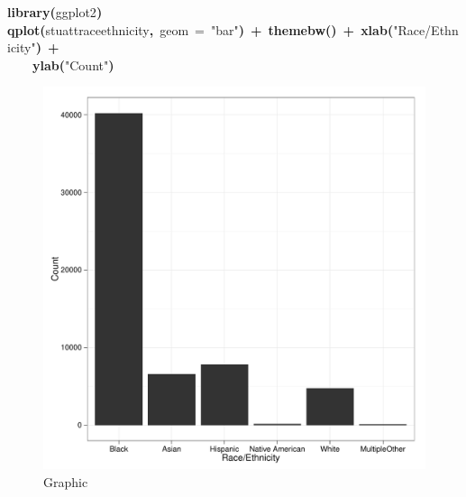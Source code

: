 \documentclass[12pt]{article}
\makeatletter
\newcommand{\hlfunctioncall}[1]{\textcolor[rgb]{0.501960784313725,0,0.329411764705882}{\textbf{#1}}}%
\newcommand{\hlstring}[1]{\textcolor[rgb]{0.6,0.6,1}{#1}}%
\newcommand{\hlkeyword}[1]{\textcolor[rgb]{0,0,0}{\textbf{#1}}}%
\newcommand{\hlargument}[1]{\textcolor[rgb]{0.690196078431373,0.250980392156863,0.0196078431372549}{#1}}%
\newcommand{\hlsymbol}[1]{\textcolor[rgb]{0,0,0}{#1}}%
\newcommand{\hlstd}[1]{\textcolor[rgb]{0,0,0}{#1}}%
\newenvironment{kframe}{%
 \def\FrameCommand##1{\hskip\@totalleftmargin \hskip-\fboxsep
 \colorbox{shadecolor}{##1}\hskip-\fboxsep
     \hskip-\linewidth \hskip-\@totalleftmargin \hskip\columnwidth}%
 \MakeFramed {\advance\hsize-\width
   \@totalleftmargin\z@ \linewidth\hsize
   \@setminipage}}%
 {\par\unskip\endMakeFramed}
\newenvironment{knitrout}{}{} %
\makeatother
\begin{document}
\begin{knitrout}
\color{fgcolor}\begin{kframe}
\begin{flushleft}
\ttfamily\noindent
\hlfunctioncall{library}\hlkeyword{(}\hlsymbol{ggplot2}\hlkeyword{)}\hspace*{\fill}\\
\hlstd{}\hlfunctioncall{qplot}\hlkeyword{(}\hlsymbol{stuatt}\hlkeyword{\usebox{\hlnormalsizeboxdollar}}\hlsymbol{race\usebox{\hlnormalsizeboxunderscore}ethnicity}\hlkeyword{,}{\ }\hlargument{geom}{\ }\hlargument{=}{\ }\hlstring{"{}bar"{}}\hlkeyword{)}{\ }\hlkeyword{+}{\ }\hlfunctioncall{theme\usebox{\hlnormalsizeboxunderscore}bw}\hlkeyword{(}\hlkeyword{)}{\ }\hlkeyword{+}{\ }\hlfunctioncall{xlab}\hlkeyword{(}\hlstring{"{}Race/Ethnicity"{}}\hlkeyword{)}{\ }\hlkeyword{+}\hspace*{\fill}\\
\hlstd{}{\ }{\ }{\ }{\ }\hlfunctioncall{ylab}\hlkeyword{(}\hlstring{"{}Count"{}}\hlkeyword{)}\mbox{}
\normalfont
\end{flushleft}
\end{kframe}\begin{figure}[]


\includegraphics[width=.75\textwidth,height=.35\paperheight]{figure/unnamed-chunk-9} \hfill{}

\caption[Graphic]{Graphic\label{fig:unnamed-chunk-9}}
\end{figure}

\end{knitrout}
\end{document}
